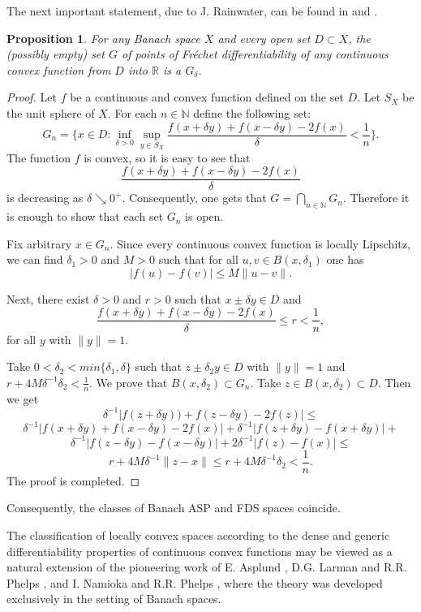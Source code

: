 \documentclass[12pt]{amsart}
\theoremstyle{plain}
\newtheorem{proposition}[theorem]{Proposition}
\theoremstyle{definition}
\theoremstyle{remark}
\def\R{{\mathbb R}}
\begin{document}
The next important statement, due to J. Rainwater, can be found in \cite[Proposition 1.25]{p} and \cite[Lemma 8.23]{y1}.

\begin{proposition}\label{Phelps}
For any Banach space $X$ and every open set $D\subset X$, the (possibly empty) set $G$ of points of  Fr\'echet differentiability of any continuous convex function from $D$ into $\R$ is a $G_{\delta}$.
\end{proposition}
\begin{proof}
Let $f$ be a continuous and convex function defined on the set $D$. Let $S_{X}$ be the unit sphere  of $X$.  For each $n\in\mathbb{N}$ define the following set:
$$G_n=\{x\in D: \inf_{\delta > 0} \sup_{y\in S_{X}} \frac{f(x+\delta y)+f(x-\delta y)-2f(x)}{\delta} < \frac{1}{n}\}.$$
The function $f$ is convex, so it is easy to see that $$\frac{f(x+\delta y)+f(x-\delta y)-2f(x)}{\delta}$$ is decreasing  as $\delta\searrow 0^{+}$.
 Consequently, one gets that $G=\bigcap_{n\in\mathbb{N}} G_n$. Therefore it is enough to show that each set $G_n$ is open.

Fix arbitrary $x\in G_n$.  Since every  continuous convex function is locally  Lipschitz, we can find $\delta_1> 0$ and $M >0$ such that for all $u,v\in B(x,\delta_1)$ one has
$$|f(u)-f(v)|\leq M\|u-v\|.$$

Next, there exist $\delta >0$ and $r >0$ such  that $x\pm \delta y\in D$  and
$$\frac{f(x+\delta y)+f(x-\delta y)-2f(x)}{\delta}\leq r < \frac{1}{n},$$
for all $y$ with $\|y\|=1$.

Take $0<\delta_2< min\{\delta_1, \delta\}$  such that $z\pm \delta_2y\in D$ with $\|y\|=1$ and $r+4M\delta^{-1}\delta_2 < \frac{1}{n}.$  We prove that $B(x,\delta_2)\subset G_n$.
Take $z\in B(x,\delta_2)\subset D.$
Then we get
$$\delta^{-1}|f(z+\delta y))+f(z-\delta y)-2f(z)|\leq$$
$$\delta^{-1}|f(x+\delta y)+f(x-\delta y)-2f(x)| + \delta^{-1}|f(z+\delta y)-f(x+\delta y)|+$$
$$\delta^{-1}|f(z-\delta y)-f(x-\delta y)|+ 2\delta^{-1}|f(z)-f(x)|\leq $$
$$r+4M\delta^{-1}\|z-x\|\leq r+4M\delta^{-1}\delta_2< \frac{1}{n}.$$
 The proof is completed.
\end{proof}
\noindent Consequently, the classes of Banach ASP and FDS spaces coincide.

The classification of locally convex spaces according to the dense and generic differentiability properties of continuous convex functions may be viewed as a natural extension of the pioneering work of E. Asplund \cite{Asplund}, D.G. Larman and R.R. Phelps \cite{Larman}, and I. Namioka and R.R. Phelps \cite{np}, where the theory was developed exclusively in the setting of Banach spaces.
\end{document}
